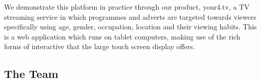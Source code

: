 We demonstrate this platform in practice through our product, your4.tv, a TV streaming service in which programmes and adverts are targeted towards viewers specifically using age, gender, occupation, location and their viewing habits. This is a web application which runs on tablet computers, making use of the rich forms of interactive that the large touch screen display offers.




\subsection{The Team}

